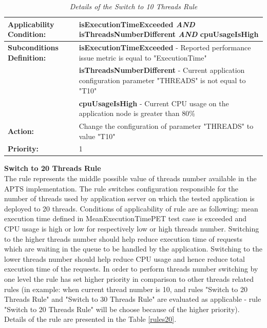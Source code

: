 \documentclass[10pt,a4paper]{article}
\begin{document}
\begin{table}[!htb]
\def\arraystretch{1.5}
\caption{\textit{Details of the Switch to 10 Threads Rule}} \label{rules10}
\begin{tabularx}{\textwidth}{p{2.1cm}|X}

\textbf{Applicability Condition:} & \textbf{isExecutionTimeExceeded} \textit{AND} \newline
\textbf{isThreadsNumberDifferent} \textit{AND} \newline
\textbf{cpuUsageIsHigh} \\ \hline

\textbf{Subconditions Definition:} & \textbf{isExecutionTimeExceeded} -  Reported performance issue metric is equal to "ExecutionTime"  \\
& \textbf{isThreadsNumberDifferent} -  Current application configuration parameter "THREADS" is not equal to "T10" \\
& \textbf{cpuUsageIsHigh} - Current CPU usage on the application node is greater than 80\% \\ \hline

\textbf{Action:} & Change the configuration of parameter "THREADS" to value "T10" \\ \hline
\textbf{Priority:} & 1\\
\end{tabularx}
\end{table}
\vspace{5mm}
\noindent\textbf{Switch to 20 Threads Rule} \\
The rule represents the middle possible value of threads number available in the APTS implementation. The rule switches configuration responsible for the number of threads used by application server on which the tested application is deployed to 20 threads. Conditions of applicability of rule are as following: mean execution time defined in MeanExecutionTimePET test case is exceeded and CPU usage is high or low for respectively low or high threads number. Switching to the higher threads number should help reduce execution time of requests which are waiting in the queue to be handled by the application. Switching to the lower threads number should help reduce CPU usage and hence reduce total execution time of the requests. In order to perform threads number switching by one level the rule has set higher priority in comparison to other threads related rules (in example: when current thread number is 10, and rules "Switch to 20 Threads Rule" and "Switch to 30 Threads Rule" are evaluated as applicable - rule "Switch to 20 Threads Rule" will be choose because of the higher priority). Details of the rule are presented in the Table \ref{rules20}.
\end{document}

